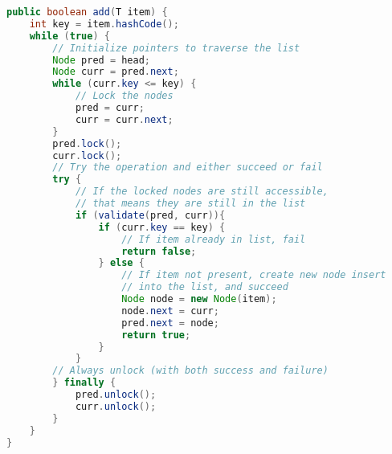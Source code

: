 \begin{tcolorbox}[colback=nightblue!5!white, colframe=nightblue!75!black, title= Add Method]
    \begin{lstlisting}[label={lst:optionsync1}, language=Java, morekeywords={$PLACE KEYWORDS HERE$}]
public boolean add(T item) {
    int key = item.hashCode();
    while (true) {
        // Initialize pointers to traverse the list
        Node pred = head;
        Node curr = pred.next;
        while (curr.key <= key) {
            // Lock the nodes
            pred = curr;
            curr = curr.next;
        }
        pred.lock();
        curr.lock();
        // Try the operation and either succeed or fail
        try {
            // If the locked nodes are still accessible,
            // that means they are still in the list
            if (validate(pred, curr)){
                if (curr.key == key) {
                    // If item already in list, fail
                    return false;
                } else {
                    // If item not present, create new node insert 
                    // into the list, and succeed
                    Node node = new Node(item);
                    node.next = curr;
                    pred.next = node;
                    return true;
                }
            }
        // Always unlock (with both success and failure)
        } finally {
            pred.unlock();
            curr.unlock();
        }
    }
}\end{lstlisting}
\end{tcolorbox}
%
\clearpage
%
